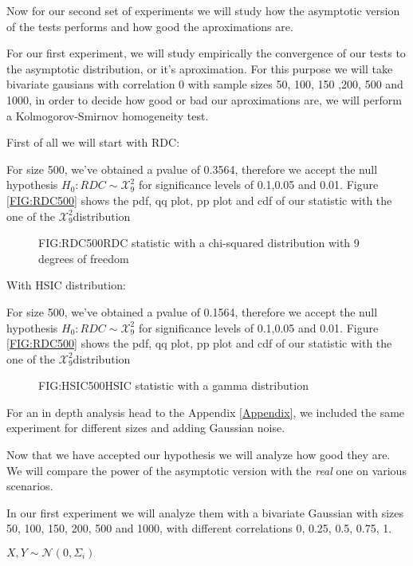 Now for our second set of experiments we will study how the asymptotic version of the tests performs and how good the aproximations are.

For our first experiment, we will study empirically the convergence of our tests to the asymptotic distribution, or it's aproximation. For this purpose we will take  bivariate gausians with correlation 0 with sample sizes  50, 100, 150 ,200, 500 and 1000, in order to decide how good or bad our aproximations are, we will perform a Kolmogorov-Smirnov homogeneity test.

First of all we will start with RDC:

For size 500, we've obtained a pvalue of 0.3564, therefore we accept the null hypothesis $H_{0}: RDC\sim \mathcal{X}^{2}_{9}$ for significance levels of 0.1,0.05 and 0.01. Figure \ref{FIG:RDC500} shows the pdf, qq plot, pp plot and cdf of our statistic with the one of the $\mathcal{X}^{2}_{9}$distribution

\begin{figure}[RDC Asymptotic distribution]{FIG:RDC500}{RDC statistic with a chi-squared distribution with 9 degrees of freedom}
\end{figure}

With HSIC distribution:

For size 500, we've obtained a pvalue of 0.1564, therefore we accept the null hypothesis $H_{0}: RDC\sim \mathcal{X}^{2}_{9}$ for significance levels of 0.1,0.05 and 0.01. Figure \ref{FIG:RDC500} shows the pdf, qq plot, pp plot and cdf of our statistic with the one of the $\mathcal{X}^{2}_{9}$distribution
\begin{figure}[HSIC Asymptotic distribution]{FIG:HSIC500}{HSIC statistic with a gamma distribution}
\end{figure}

For an in depth analysis head to the Appendix \ref{Appendix}, we included the same experiment for different sizes and adding Gaussian noise.

Now that we have accepted our hypothesis we will analyze how good they are. We will compare the power of the asymptotic version with the \textit{real} one on various scenarios.

In our first experiment we will analyze them with a bivariate Gaussian with sizes 50, 100, 150, 200, 500 and 1000, with different correlations 0, 0.25, 0.5, 0.75, 1.

$ X,Y \sim \mathcal{N}(0,\Sigma_{i}) $


